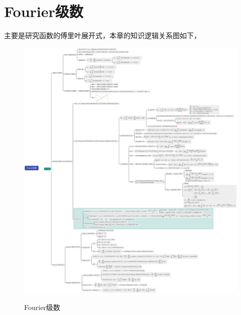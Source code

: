 \section{Fourier级数}

主要是研究函数的傅里叶展开式，本章的知识逻辑关系图如下，
\begin{figure}[!htb]
    \includegraphics[scale=0.2]{Chapter/TikZ/Fourier级数.pdf}
    \label{Fourier级数}
    \caption{Fourier级数}
\end{figure}